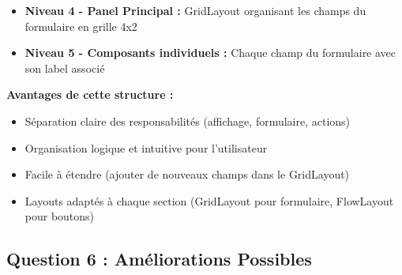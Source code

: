 \documentclass[11pt,a4paper]{article}
\begin{document}
\begin{correctionbox}
\begin{itemize}
    \item \textbf{Niveau 4 - Panel Principal :} GridLayout organisant les champs du formulaire en grille 4x2
    
    \item \textbf{Niveau 5 - Composants individuels :} Chaque champ du formulaire avec son label associé
\end{itemize}

\textbf{Avantages de cette structure :}
\begin{itemize}
    \item Séparation claire des responsabilités (affichage, formulaire, actions)
    \item Organisation logique et intuitive pour l'utilisateur
    \item Facile à étendre (ajouter de nouveaux champs dans le GridLayout)
    \item Layouts adaptés à chaque section (GridLayout pour formulaire, FlowLayout pour boutons)
\end{itemize}
\end{correctionbox}

\subsection{Question 6 : Améliorations Possibles}
\end{document}
